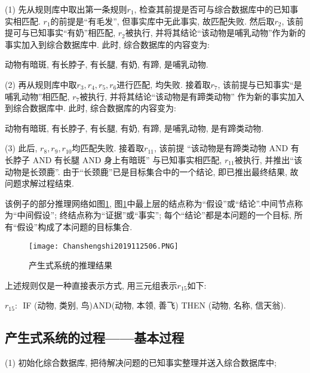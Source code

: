 (1) 先从规则库中取出第一条规则$r_1$, 检查其前提是否可与综合数据库中的已知事实相匹配. $r_1$的前提是“有毛发”, 但事实库中无此事实, 故匹配失败. 然后取$r_2$, 该前提可与已知事实“有奶”相匹配, $r_2$被执行,
并将其结论“该动物是哺乳动物”作为新的事实加入到综合数据库中. 此时, 综合数据库的内容变为:
\begin{center}
    动物有暗斑, 有长脖子, 有长腿, 有奶, 有蹄, \textcolor[rgb]{0,0,1}{是哺乳动物}.
\end{center}

(2) 再从规则库中取$r_3,r_4,r_5,r_6$进行匹配, 均失败. 接着取$r_7$, 该前提与已知事实“是哺乳动物”相匹配, $r_7$被执行, 并将其结论“该动物是有蹄类动物” 作为新的事实加入到综合数据库中. 此时, 综合数据库的内容变为:
\begin{center}
    动物有暗斑, 有长脖子, 有长腿, 有奶, 有蹄, 是哺乳动物, \textcolor[rgb]{0,0,1}{是有蹄类动物}.
\end{center}

(3) 此后, $r_8,r_9,r_{10}$均匹配失败. 接着取$r_{11}$, 该前提 “该动物是有蹄类动物  AND  有长脖子  AND  有长腿  AND  身上有暗斑” 与已知事实相匹配, $r_{11}$被执行, 并推出“\textcolor[rgb]{1,0,0}{该动物是长颈鹿}”. 由于“长颈鹿”已是目标集合中的一个结论, 即已推出最终结果, 故问题求解过程结束.

该例子的部分推理网络如图\ref{AI32fig06}, 图\ref{AI32fig06}中最上层的结点称为“假设”或“结论”.中间节点称为“中间假设”; 终结点称为“证据”或“事实”; 每个“结论”都是本问题的一个目标, 所有“假设”构成了本问题的目标集合.
\begin{figure}[H]
    \centering
    \texttt{[image: Chanshengshi2019112506.PNG]}
    \caption{产生式系统的推理结果}
    \label{AI32fig06}
\end{figure}
\begin{remark}
    上述规则仅是一种直接表示方式, 用三元组表示$r_{15}$如下:
\begin{center}
  $r_{15}$: \,\,\textup{IF}\,\,(动物, 类别, 鸟)AND(动物, 本领, 善飞)\,\,\textup{THEN}\,\,(动物, 名称, 信天翁).
\end{center}
\end{remark}
\subsection{产生式系统的过程——基本过程}

(1) 初始化综合数据库, 把待解决问题的已知事实整理并送入综合数据库中;

